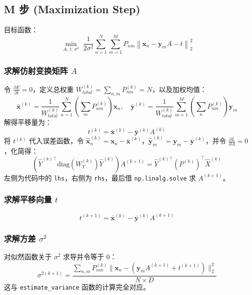 \documentclass{article}
\begin{document}
\subsection{M 步 (Maximization Step)}
目标函数：
\begin{equation}
    \min_{A,\, t,\, \sigma^2} \; \frac{1}{2\sigma^2} \sum_{n=1}^{N} \sum_{m=1}^{M} P_{nm} \left\| \bm{x}_n -  \bm{y}_mA - t \right\|_2^2
\end{equation}

\subsubsection{求解仿射变换矩阵 $A$}
令 $\frac{\partial E}{\partial t} = 0$，定义总权重 $W_{total}^{(k)} = \sum_{n,m} P_{nm}^{(k)} = N$，以及加权均值：
\begin{equation}
    \bar{\bm{x}}^{(k)} = \frac{1}{W_{total}^{(k)}} \sum_{n=1}^{N} \left(\sum_m P_{nm}^{(k)}\right) \bm{x}_n, \quad \bar{\bm{y}}^{(k)} = \frac{1}{W_{total}^{(k)}} \sum_{m=1}^{M} \left(\sum_n P_{nm}^{(k)}\right) \bm{y}_m
\end{equation}
解得平移量为：
\begin{equation}
    t^{(k)} = \bar{\bm{x}}^{(k)} - \bar{\bm{y}}^{(k)} A^{(k)}
\end{equation}
将 $t^{(k)}$ 代入误差函数，令 $\hat{\bm{x}}_n^{(k)} = \bm{x}_n - \bar{\bm{x}}^{(k)}$，$\hat{\bm{y}}_m^{(k)} = \bm{y}_m - \bar{\bm{y}}^{(k)}$，并令 $\frac{\partial L}{\partial A} = 0$，化简得：
\begin{equation}
    (\hat{Y}^{(k)\top} \text{diag}(W_Y^{(k)}) \hat{Y}^{(k)}) A^{(k+1)} = \hat{Y}^{(k)\top} (P^{(k)})^\top \hat{X}^{(k)}
\end{equation}
左侧为代码中的 \texttt{lhs}，右侧为 \texttt{rhs}，最后借 \texttt{np.linalg.solve} 求 $A^{(k+1)}$。

\subsubsection{求解平移向量 $t$}
\begin{equation}
    t^{(k+1)} = \bar{\bm{x}}^{(k)} - \bar{\bm{y}}^{(k)} A^{(k+1)}
\end{equation}

\subsubsection{求解方差 $\sigma^2$}
对似然函数关于 $\sigma^2$ 求导并令等于 $0$：
\begin{equation}
    \sigma^{2(k+1)} = \frac{\sum_{n,m} P_{nm}^{(k)} \| \bm{x}_n - (\bm{y}_m A^{(k+1)} + t^{(k+1)}) \|_2^2}{N \times D}
\end{equation}
这与 \texttt{estimate\_variance} 函数的计算完全对应。
\end{document}
